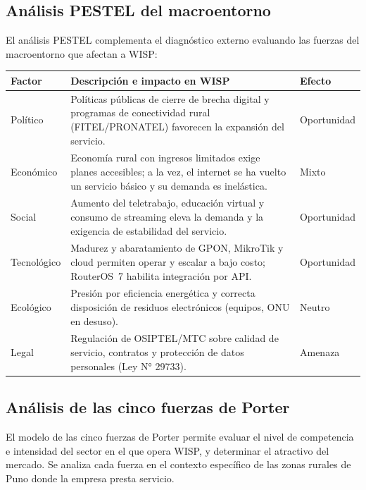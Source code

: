 \subsection{Análisis PESTEL del macroentorno}

El análisis PESTEL complementa el diagnóstico externo evaluando las fuerzas del
macroentorno que afectan a WISP:

\begin{center}
\label{tab:pestel}
\begin{tabularx}{\textwidth}{L{2cm} X L{2.3cm}}
\toprule
\textbf{Factor} & \textbf{Descripción e impacto en WISP} & \textbf{Efecto} \\
\midrule
Político &
Políticas públicas de cierre de brecha digital y programas de conectividad rural
(FITEL/PRONATEL) favorecen la expansión del servicio. & Oportunidad \\
Económico &
Economía rural con ingresos limitados exige planes accesibles; a la vez, el
internet se ha vuelto un servicio básico y su demanda es inelástica. & Mixto \\
Social &
Aumento del teletrabajo, educación virtual y consumo de streaming eleva la demanda
y la exigencia de estabilidad del servicio. & Oportunidad \\
Tecnológico &
Madurez y abaratamiento de GPON, MikroTik y cloud permiten operar y escalar a bajo
costo; RouterOS~7 habilita integración por API. & Oportunidad \\
Ecológico &
Presión por eficiencia energética y correcta disposición de residuos electrónicos
(equipos, ONU en desuso). & Neutro \\
Legal &
Regulación de OSIPTEL/MTC sobre calidad de servicio, contratos y protección de
datos personales (Ley N° 29733). & Amenaza \\
\bottomrule
\end{tabularx}
\end{center}

\subsection{Análisis de las cinco fuerzas de Porter}

El modelo de las cinco fuerzas de Porter permite evaluar el nivel de competencia e
intensidad del sector en el que opera WISP, y determinar el atractivo del mercado.
Se analiza cada fuerza en el contexto específico de las zonas rurales de Puno donde
la empresa presta servicio.

